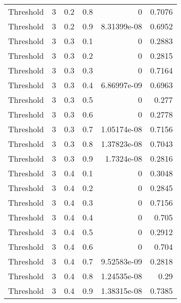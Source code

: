 \documentclass{article}
\begin{document}
\begin{longtable}[H]{lrrrrr}
 Threshold      &       3 &   0.2 &            0.8 &      0           &          0.7076 \\
 Threshold      &       3 &   0.2 &            0.9 &      8.31399e-08 &          0.6952 \\
 Threshold      &       3 &   0.3 &            0.1 &      0           &          0.2883 \\
 Threshold      &       3 &   0.3 &            0.2 &      0           &          0.2815 \\
 Threshold      &       3 &   0.3 &            0.3 &      0           &          0.7164 \\
 Threshold      &       3 &   0.3 &            0.4 &      6.86997e-09 &          0.6963 \\
 Threshold      &       3 &   0.3 &            0.5 &      0           &          0.277  \\
 Threshold      &       3 &   0.3 &            0.6 &      0           &          0.2778 \\
 Threshold      &       3 &   0.3 &            0.7 &      1.05174e-08 &          0.7156 \\
 Threshold      &       3 &   0.3 &            0.8 &      1.37823e-08 &          0.7043 \\
 Threshold      &       3 &   0.3 &            0.9 &      1.7324e-08  &          0.2816 \\
 Threshold      &       3 &   0.4 &            0.1 &      0           &          0.3048 \\
 Threshold      &       3 &   0.4 &            0.2 &      0           &          0.2845 \\
 Threshold      &       3 &   0.4 &            0.3 &      0           &          0.7156 \\
 Threshold      &       3 &   0.4 &            0.4 &      0           &          0.705  \\
 Threshold      &       3 &   0.4 &            0.5 &      0           &          0.2912 \\
 Threshold      &       3 &   0.4 &            0.6 &      0           &          0.704  \\
 Threshold      &       3 &   0.4 &            0.7 &      9.52583e-09 &          0.2818 \\
 Threshold      &       3 &   0.4 &            0.8 &      1.24535e-08 &          0.29   \\
 Threshold      &       3 &   0.4 &            0.9 &      1.38315e-08 &          0.7385 \\

\end{longtable}
\end{document}

